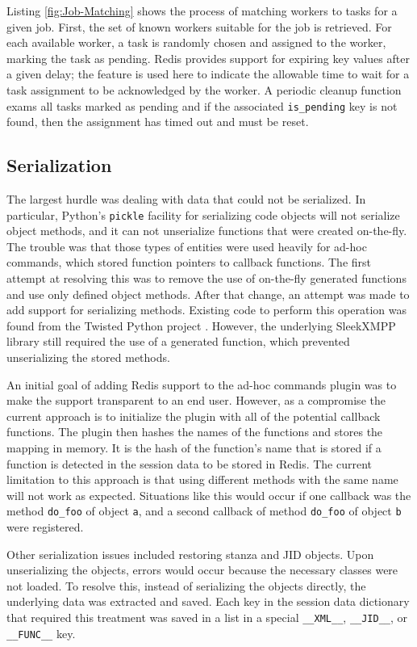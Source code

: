 Listing \ref{fig:Job-Matching} shows the process of matching workers to tasks for
a given job. First, the set of known workers suitable for the job is retrieved. For
each available worker, a task is randomly chosen and assigned to the worker, marking
the task as pending. Redis provides support for expiring key values after a given delay;
the feature is used here to indicate the allowable time to wait for a task assignment
to be acknowledged by the worker. A periodic cleanup function exams all tasks marked as 
pending and if the associated \texttt{is\_pending} key is not found, then the assignment
has timed out and must be reset.

\subsection{Serialization}
The largest hurdle was dealing with data that could not be serialized. In particular,
Python's \texttt{pickle} facility for serializing code objects will not serialize
object methods, and it can not unserialize functions that were created on-the-fly.
The trouble was that those types of entities were used heavily for ad-hoc commands,
which stored function pointers to callback functions. The first attempt at resolving
this was to remove the use of on-the-fly generated functions and use only defined
object methods. After that change, an attempt was made to add support for serializing
methods. Existing code to perform this operation was found from the Twisted Python
project \cite{Twisted}. However, the underlying SleekXMPP library still required the use of a
generated function, which prevented unserializing the stored methods.

An initial goal of adding Redis support to the ad-hoc commands plugin was to make the
support transparent to an end user. However, as a compromise the current approach
is to initialize the plugin with all of the potential callback functions. The plugin
then hashes the names of the functions and stores the mapping in memory. It is the hash
of the function's name that is stored if a function is detected in the session data to be stored
in Redis. The current limitation to this approach is that using different
methods with the same name will not work as expected. Situations like this would occur
if one callback was the method \texttt{do\_foo} of object \texttt{a}, and a second
callback of method \texttt{do\_foo} of object \texttt{b} were registered.

Other serialization issues included restoring stanza and JID objects. Upon unserializing
the objects, errors would occur because the necessary classes were not loaded. To resolve
this, instead of serializing the objects directly, the underlying data was extracted and
saved. Each key in the session data dictionary that required this treatment was saved in
a list in a special \texttt{\_\_XML\_\_}, \texttt{\_\_JID\_\_}, or \texttt{\_\_FUNC\_\_} key.

